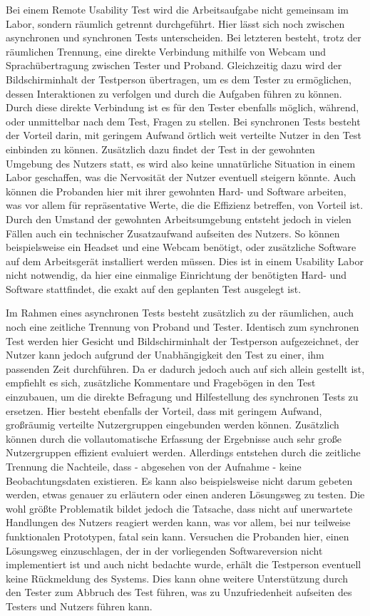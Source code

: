 Bei einem Remote Usability Test wird die Arbeitsaufgabe nicht gemeinsam im Labor, sondern räumlich getrennt durchgeführt.
Hier lässt sich noch zwischen asynchronen und synchronen Tests unterscheiden.
Bei letzteren besteht, trotz der räumlichen Trennung, eine direkte Verbindung mithilfe von Webcam und Sprachübertragung zwischen Tester und Proband.
Gleichzeitig dazu wird der Bildschirminhalt der Testperson übertragen, um es dem Tester zu ermöglichen, dessen Interaktionen zu verfolgen und durch die Aufgaben führen zu können.
Durch diese direkte Verbindung ist es für den Tester ebenfalls möglich, während, oder unmittelbar nach dem Test, Fragen zu stellen.
Bei synchronen Tests besteht der Vorteil darin, mit geringem Aufwand örtlich weit verteilte Nutzer in den Test einbinden zu können.
Zusätzlich dazu findet der Test in der gewohnten Umgebung des Nutzers statt, es wird also keine unnatürliche Situation in einem Labor geschaffen, was die Nervosität der Nutzer eventuell steigern könnte.
Auch können die Probanden hier mit ihrer gewohnten Hard- und Software arbeiten, was vor allem für repräsentative Werte, die die Effizienz betreffen, von Vorteil ist.
Durch den Umstand der gewohnten Arbeitsumgebung entsteht jedoch in vielen Fällen auch ein technischer Zusatzaufwand aufseiten des Nutzers.
So können beispielsweise ein Headset und eine Webcam benötigt, oder zusätzliche Software auf dem Arbeitsgerät installiert werden müssen.
Dies ist in einem Usability Labor nicht notwendig, da hier eine einmalige Einrichtung der benötigten Hard- und Software stattfindet, die exakt auf den geplanten Test ausgelegt ist.

Im Rahmen eines asynchronen Tests besteht zusätzlich zu der räumlichen, auch noch eine zeitliche Trennung von Proband und Tester.
Identisch zum synchronen Test werden hier Gesicht und Bildschirminhalt der Testperson aufgezeichnet, der Nutzer kann jedoch aufgrund der Unabhängigkeit den Test zu einer, ihm passenden Zeit durchführen.
Da er dadurch jedoch auch auf sich allein gestellt ist, empfiehlt es sich, zusätzliche Kommentare und Fragebögen in den Test einzubauen, um die direkte Befragung und Hilfestellung des synchronen Tests zu ersetzen.
Hier besteht ebenfalls der Vorteil, dass mit geringem Aufwand, großräumig verteilte Nutzergruppen eingebunden werden können.
Zusätzlich können durch die vollautomatische Erfassung der Ergebnisse auch sehr große Nutzergruppen effizient evaluiert werden.
Allerdings entstehen durch die zeitliche Trennung die Nachteile, dass - abgesehen von der Aufnahme - keine Beobachtungsdaten existieren.
Es kann also beispielsweise nicht darum gebeten werden, etwas genauer zu erläutern oder einen anderen Lösungsweg zu testen.
Die wohl größte Problematik bildet jedoch die Tatsache, dass nicht auf unerwartete Handlungen des Nutzers reagiert werden kann, was vor allem, bei nur teilweise funktionalen Prototypen, fatal sein kann.
Versuchen die Probanden hier, einen Lösungsweg einzuschlagen, der in der vorliegenden Softwareversion nicht implementiert ist und auch nicht bedachte wurde, erhält die Testperson eventuell keine Rückmeldung des Systems.
Dies kann ohne weitere Unterstützung durch den Tester zum Abbruch des Test führen, was zu Unzufriedenheit aufseiten des Testers und Nutzers führen kann.\cite{Sarodnick.2016}

